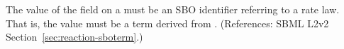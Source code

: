 The value of the  field on a \KineticLaw must be an SBO
identifier referring to a rate law.  That is, the value must be a term
derived from \sboratelaw.  (References: SBML L2v2
Section~\ref{sec:reaction-sboterm}.)

